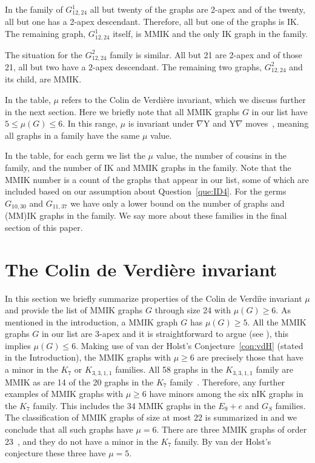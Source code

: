 \documentclass{amsart}
\theoremstyle{remark}
\newcommand{\ty}{\nabla\mathrm{Y}}
\newcommand{\yt}{\mathrm{Y}\nabla}
\begin{document}
{In the family of $G^1_{12,24}$ all but twenty of the 
graphs are 2-apex and of the twenty, all but one has a 2-apex descendant. Therefore, all but one of the graphs is IK. The remaining graph, $G^1_{12,24}$ itself, is MMIK and the only IK graph in the family. 

The situation for the $G^2_{12,24}$ family is similar.
All but 21 are 2-apex and of those 21, all but two have
a $2$-apex descendant. The remaining two graphs,
$G^2_{12,24}$ and its child, are MMIK.

In the table, $\mu$ refers to the Colin de Verdi\`ere invariant, which we discuss further in the next section. 
Here we briefly note that all MMIK graphs $G$ in our list have $5 \leq \mu(G) \leq 6$. In this range, $\mu$ is invariant 
under $\ty$ and $\yt$ moves~\cite{HLS}, meaning all graphs in a family have the same $\mu$ value.

In the table, for each germ we list the $\mu$ value,  the number of cousins in the family, and the number of IK and MMIK graphs in the family. 
Note that the MMIK number is a count of the graphs that appear in our list, some of which are included based on our assumption about Question~\ref{que:ID4}.
For the germs $G_{10,30}$ and $G_{11,37}$ we have only a lower bound on the number of graphs and (MM)IK graphs  in the family.
We say more about these families in the final
section of this paper.


\section{The Colin de Verdi\`ere invariant}
\label{sec:mu}

In this section we briefly summarize properties of the Colin de Verdi\`re invariant $\mu$ and provide the list of MMIK graphs $G$ through size 24 with $\mu(G) \geq 6$.
As mentioned in the introduction, a MMIK graph $G$ has $\mu(G) \geq 5$. All the MMIK graphs $G$ in our list are $3$-apex and it is straightforward to argue (see \cite[Lemma 5.4]{MNPP}), this implies $\mu(G) \leq 6$. Making use of van der Holst's Conjecture~\ref{con:vdH} (stated in the Introduction), the MMIK graphs with $\mu \geq 6$ are precisely those that have 
a minor in the $K_7$ or $K_{3,3,1,1}$ families. All 58 graphs in the $K_{3,3,1,1}$ family are MMIK as are 14 of the 20 graphs in the $K_7$ family~\cite{GMN}.
Therefore, any further examples of MMIK graphs with $\mu \geq 6$ have minors among the six nIK graphs in the $K_7$ family. This includes the 34
MMIK graphs in the  $E_9+e$ and $G_S$ families. The classification of MMIK graphs of size at most 22 is summarized in \cite{FMMNN} and we conclude
that all such graphs have $\mu=6$. There are three MMIK graphs of order 23~\cite{KM}, and they do not have a minor in the $K_7$ family. By van der Holst's conjecture these three have $\mu = 5$.

}
\end{document}
